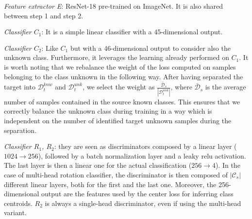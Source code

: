 \documentclass[10pt,twocolumn,letterpaper]{article}
\begin{document}
{\it Feature extractor E}: ResNet-18 pre-trained on ImageNet. It is also shared between step 1 and step 2.

{\it Classifier $C_1$}:
It is a simple linear classifier with a 45-dimensional output.

{\it Classifier $C_2$}:
Like $C_1$ but with a 46-dimensional output to consider also the unknown class. Furthermore, it leverages the learning already performed on $C_1$.
It is worth noting that we rebalance the weight of the loss computed on samples belonging to the class unknown in the following way.
After having separated the target into $\mathcal{D}_t^{knw}$ and $\mathcal{D}_t^{unk}$,
we select the weight as $\frac{\mathcal{\bar{D}}_s}{|\mathcal{D}_t^{unk}|}$,
where ${\mathcal{\bar{D}}_s}$ is the average number of samples contained in the source known classes.
This ensures that we correctly balance the unknown class during training in a way which is independent
on the number of identified target unknown samples during the separation.

{\it Classifier $R_1$, $R_2$}: 
they are seen as discriminators composed by a linear layer ($1024\to 256$),
followed by a batch normalization layer and a leaky relu activation.
The last layer is then a linear one for the actual classification ($256\to 4$).
In the case of multi-head rotation classifier,
the discriminator is then composed of $|\mathcal{C}_s|$ different linear layers, both for the first and the last one.
Moreover, the 256-dimensional output are the features used by the center loss for inferring class centroids.
$R_2$ is always a single-head discriminator, even if using the multi-head variant.
\end{document}
